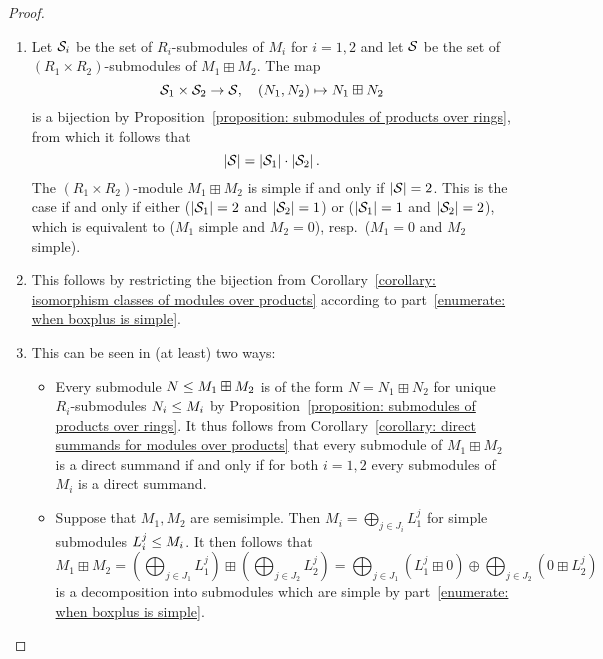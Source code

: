 \begin{proof}
  \leavevmode
  \begin{enumerate}
    \item
      Let $\mathcal{S}_i$ be the set of $R_i$-submodules of $M_i$ for $i = 1, 2$ and let $\mathcal{S}$ be the set of $(R_1 \times R_2)$-submodules of $M_1 \boxplus M_2$.
      The map
      \[
                  \mathcal{S}_1 \times \mathcal{S}_2
        \to      \mathcal{S},
        \quad    (N_1, N_2)
        \mapsto  N_1 \boxplus N_2
      \]
      is a bijection by Proposition~\ref{proposition: submodules of products over rings}, from which it follows that
      \[
        |\mathcal{S}| = |\mathcal{S}_1| \cdot |\mathcal{S}_2| \,.
      \]
      The $(R_1 \times R_2)$-module $M_1 \boxplus M_2$ is simple if and only if $|\mathcal{S}| = 2$.
      This is the case if and only if either ($|\mathcal{S}_1| = 2$ and $|\mathcal{S}_2| = 1$) or ($|\mathcal{S}_1| = 1$ and $|\mathcal{S}_2| = 2$), which is equivalent to ($M_1$ simple and $M_2 = 0$), resp.\ ($M_1 = 0$ and $M_2$ simple).
    \item
      This follows by restricting the bijection from Corollary~\ref{corollary: isomorphism classes of modules over products} according to part~\ref*{enumerate: when boxplus is simple}.
        \item
      This can be seen in (at least) two ways:
      
      \begin{itemize}
        \item
          Every submodule $N \leq M_1 \boxplus M_2$ is of the form $N = N_1 \boxplus N_2$ for unique $R_i$-submodules $N_i \leq M_i$ by Proposition~\ref{proposition: submodules of products over rings}.
          It thus follows from Corollary~\ref{corollary: direct summands for modules over products} that every submodule of $M_1 \boxplus M_2$ is a direct summand if and only if for both $i = 1, 2$ every submodules of $M_i$ is a direct summand.
        \item
          Suppose that $M_1, M_2$ are semisimple.
          Then $M_i = \bigoplus_{j \in J_i} L^j_1$ for simple submodules $L^j_i \leq M_i$.
          It then follows that
          \[
              M_1 \boxplus M_2
            = \left( \bigoplus_{j \in J_1} L^j_1 \right)
              \boxplus
              \left( \bigoplus_{j \in J_2} L^j_2 \right)
            = \bigoplus_{j \in J_1} (L^j_1 \boxplus 0)
              \oplus
              \bigoplus_{j \in J_2} (0 \boxplus L^j_2)
          \]
          is a decomposition into submodules which are simple by part~\ref*{enumerate: when boxplus is simple}.
          

\end{itemize}
\end{enumerate}
\end{proof}
